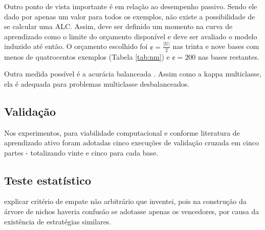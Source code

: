Outro ponto de vista importante é em relação ao desempenho passivo.
Sendo ele dado por apenas um valor para todos os exemplos, não existe
a possibilidade de se calcular uma ALC.
Assim, deve ser definido um momento na curva de aprendizado como o
limite do orçamento disponível e deve ser avaliado o modelo induzido até então.
O orçamento escolhido foi $\cent=\frac{|\mathcal{U}|}{2}$
nas trinta e nove bases com menos de quatrocentos exemplos (Tabela \ref{tab:nm})
e  $\cent=200$ nas bases restantes.

Outra medida possível é a acurácia balanceada \citep{journals/bmcbi/MassoV10}.
Assim como a kappa multiclasse, ela é adequada para problemas multiclasse desbalanceados.




\subsection{Validação}\label{validacao}
Nos experimentos,
para viabilidade computacional e conforme literatura de aprendizado ativo 
foram adotadas cinco execuções de validação cruzada em cinco partes -
totalizando vinte e cinco \pools para cada base.



\subsection{Teste estatístico}

explicar critério de empate não arbitrário que inventei, pois na construção da árvore de nichos
haveria confusão se adotasse apenas os vencedores, por causa da existência de estratégias similares.


